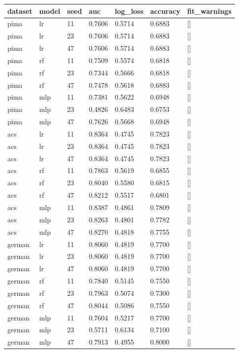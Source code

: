 \begingroup\footnotesize\setlength{\tabcolsep}{3pt}
\begin{tabular}{lllllll}
\toprule
dataset & model & seed & auc & log\_loss & accuracy & fit\_warnings \\
\midrule
pima & lr & 11 & 0.7606 & 0.5714 & 0.6883 & [] \\
pima & lr & 23 & 0.7606 & 0.5714 & 0.6883 & [] \\
pima & lr & 47 & 0.7606 & 0.5714 & 0.6883 & [] \\
pima & rf & 11 & 0.7509 & 0.5574 & 0.6818 & [] \\
pima & rf & 23 & 0.7344 & 0.5666 & 0.6818 & [] \\
pima & rf & 47 & 0.7478 & 0.5618 & 0.6883 & [] \\
pima & mlp & 11 & 0.7381 & 0.5622 & 0.6948 & [] \\
pima & mlp & 23 & 0.4826 & 0.6483 & 0.6753 & [] \\
pima & mlp & 47 & 0.7626 & 0.5668 & 0.6948 & [] \\
acs & lr & 11 & 0.8364 & 0.4745 & 0.7823 & [] \\
acs & lr & 23 & 0.8364 & 0.4745 & 0.7823 & [] \\
acs & lr & 47 & 0.8364 & 0.4745 & 0.7823 & [] \\
acs & rf & 11 & 0.7863 & 0.5619 & 0.6855 & [] \\
acs & rf & 23 & 0.8040 & 0.5580 & 0.6815 & [] \\
acs & rf & 47 & 0.8212 & 0.5517 & 0.6801 & [] \\
acs & mlp & 11 & 0.8387 & 0.4861 & 0.7809 & [] \\
acs & mlp & 23 & 0.8263 & 0.4801 & 0.7782 & [] \\
acs & mlp & 47 & 0.8270 & 0.4818 & 0.7755 & [] \\
german & lr & 11 & 0.8060 & 0.4819 & 0.7700 & [] \\
german & lr & 23 & 0.8060 & 0.4819 & 0.7700 & [] \\
german & lr & 47 & 0.8060 & 0.4819 & 0.7700 & [] \\
german & rf & 11 & 0.7840 & 0.5145 & 0.7550 & [] \\
german & rf & 23 & 0.7963 & 0.5074 & 0.7300 & [] \\
german & rf & 47 & 0.8044 & 0.5086 & 0.7550 & [] \\
german & mlp & 11 & 0.7604 & 0.5217 & 0.7700 & [] \\
german & mlp & 23 & 0.5711 & 0.6134 & 0.7100 & [] \\
german & mlp & 47 & 0.7913 & 0.4955 & 0.8000 & [] \\
\bottomrule
\end{tabular}
\endgroup
